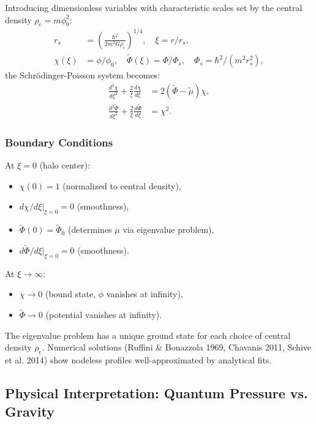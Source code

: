 \documentclass[11pt,a4paper]{article}
\newcommand{\rhoc}{\ensuremath{\rho_{\mathrm{c}}}}
\theoremstyle{definition}
\theoremstyle{remark}
\begin{document}
Introducing dimensionless variables with characteristic scales set by the central density $\rhoc = m\phi_0^2$:
\begin{align}
r_s &= \left(\frac{\hbar^2}{2m^2 G \rhoc}\right)^{1/4}, \quad \xi = r/r_s, \\
\chi(\xi) &= \phi/\phi_0, \quad \tilde{\Phi}(\xi) = \Phi/\Phi_s, \quad \Phi_s = \hbar^2/(m^2 r_s^2),
\end{align}
the Schr\"odinger-Poisson system becomes:
\begin{align}
\frac{d^2\chi}{d\xi^2} + \frac{2}{\xi}\frac{d\chi}{d\xi} &= 2(\tilde{\Phi} - \tilde{\mu})\chi, \label{eq:SP_dimensionless_1}\\
\frac{d^2\tilde{\Phi}}{d\xi^2} + \frac{2}{\xi}\frac{d\tilde{\Phi}}{d\xi} &= \chi^2. \label{eq:SP_dimensionless_2}
\end{align}

\subsubsection{Boundary Conditions}

At $\xi = 0$ (halo center):
\begin{itemize}[leftmargin=*]
\item $\chi(0) = 1$ (normalized to central density),
\item $d\chi/d\xi|_{\xi=0} = 0$ (smoothness),
\item $\tilde{\Phi}(0) = \tilde{\Phi}_0$ (determines $\mu$ via eigenvalue problem),
\item $d\tilde{\Phi}/d\xi|_{\xi=0} = 0$ (smoothness).
\end{itemize}

At $\xi \to \infty$:
\begin{itemize}[leftmargin=*]
\item $\chi \to 0$ (bound state, $\phi$ vanishes at infinity),
\item $\tilde{\Phi} \to 0$ (potential vanishes at infinity).
\end{itemize}

The eigenvalue problem has a unique ground state for each choice of central density $\rhoc$. Numerical solutions (Ruffini \& Bonazzola 1969, Chavanis 2011, Schive et al. 2014) show nodeless profiles well-approximated by analytical fits.

\subsection{Physical Interpretation: Quantum Pressure vs. Gravity}
\label{sec:quantum_pressure}
\end{document}
